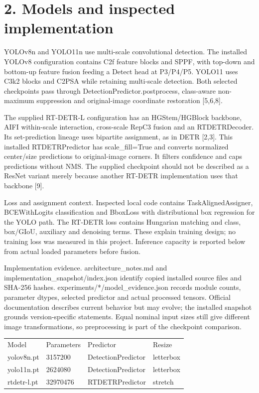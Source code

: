 \documentclass[10pt]{article}
\begin{document}
\section*{2. Models and inspected implementation}
YOLOv8n and YOLO11n use multi-scale convolutional detection. The installed YOLOv8 configuration contains C2f feature blocks and SPPF, with top-down and bottom-up feature fusion feeding a Detect head at P3/P4/P5. YOLO11 uses C3k2 blocks and C2PSA while retaining multi-scale detection. Both selected checkpoints pass through DetectionPredictor.postprocess, class-aware non-maximum suppression and original-image coordinate restoration [5,6,8].


The supplied RT-DETR-L configuration has an HGStem/HGBlock backbone, AIFI within-scale interaction, cross-scale RepC3 fusion and an RTDETRDecoder. Its set-prediction lineage uses bipartite assignment, as in DETR [2,3]. This installed RTDETRPredictor has scale\_fill=True and converts normalized center/size predictions to original-image corners. It filters confidence and caps predictions without NMS. The supplied checkpoint should not be described as a ResNet variant merely because another RT-DETR implementation uses that backbone [9].


Loss and assignment context. Inspected local code contains TaskAlignedAssigner, BCEWithLogits classification and BboxLoss with distributional box regression for the YOLO path. The RT-DETR loss contains Hungarian matching and class, box/GIoU, auxiliary and denoising terms. These explain training design; no training loss was measured in this project. Inference capacity is reported below from actual loaded parameters before fusion.


Implementation evidence. architecture\_notes.md and implementation\_snapshot/index.json identify copied installed source files and SHA-256 hashes. experiments/*/model\_evidence.json records module counts, parameter dtypes, selected predictor and actual processed tensors. Official documentation describes current behavior but may evolve; the installed snapshot grounds version-specific statements. Equal nominal input sizes still give different image transformations, so preprocessing is part of the checkpoint comparison.


\begin{longtable}{llll}
Model & Parameters & Predictor & Resize \\
yolov8n.pt & 3157200 & DetectionPredictor & letterbox \\
yolo11n.pt & 2624080 & DetectionPredictor & letterbox \\
rtdetr-l.pt & 32970476 & RTDETRPredictor & stretch \\
\end{longtable}
\newpage
\end{document}
